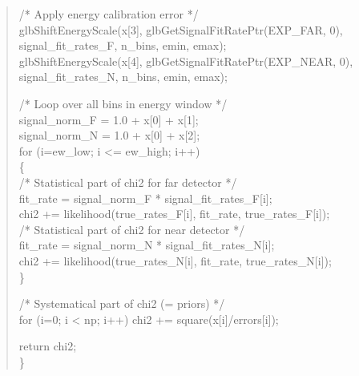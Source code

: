 {\begin{quote}
{  \hspace*{0.3cm} /* Apply energy calibration error */ \\
  \hspace*{0.3cm} glbShiftEnergyScale(x[3], glbGetSignalFitRatePtr(EXP\_FAR, 0), \\
  \hspace*{0.9cm}                    signal\_fit\_rates\_F, n\_bins, emin, emax); \\
  \hspace*{0.3cm} glbShiftEnergyScale(x[4], glbGetSignalFitRatePtr(EXP\_NEAR, 0), \\
  \hspace*{0.9cm}                    signal\_fit\_rates\_N, n\_bins, emin, emax); 

  \hspace*{0.3cm} /* Loop over all bins in energy window */ \\
  \hspace*{0.3cm} signal\_norm\_F = 1.0 + x[0] + x[1]; \\
  \hspace*{0.3cm} signal\_norm\_N = 1.0 + x[0] + x[2]; \\
  \hspace*{0.3cm} for (i=ew\_low; i <= ew\_high; i++) \\
  \hspace*{0.3cm} \{ \\
  \hspace*{0.6cm}  /* Statistical part of chi2 for far detector */ \\
  \hspace*{0.6cm}  fit\_rate  = signal\_norm\_F * signal\_fit\_rates\_F[i]; \\
  \hspace*{0.6cm}  chi2 += likelihood(true\_rates\_F[i], fit\_rate, true\_rates\_F[i]); \\
   
  \hspace*{0.6cm}  /* Statistical part of chi2 for near detector  */ \\
  \hspace*{0.6cm}  fit\_rate  = signal\_norm\_N * signal\_fit\_rates\_N[i]; \\
  \hspace*{0.6cm}  chi2 += likelihood(true\_rates\_N[i], fit\_rate, true\_rates\_N[i]); \\
  \hspace*{0.3cm} \} 

  \hspace*{0.3cm} /* Systematical part of chi2 (= priors) */ \\
  \hspace*{0.3cm} for (i=0; i < np; i++)  chi2 += square(x[i]/errors[i]);

 \hspace*{0.3cm} return chi2; \\
\} 
}
\end{quote}
}

